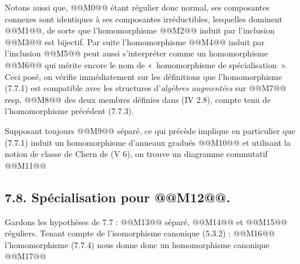 
Notons aussi que, @@M0@@ étant régulier donc normal, ses composantes connexes sont identiques à ses composantes irréductibles, lesquelles dominent @@M1@@, de sorte que l'homomorphisme @@M2@@ induit par l'inclusion @@M3@@ est bijectif. Par suite l'homomorphisme @@M4@@ induit par l'inclusion @@M5@@ peut aussi s'interpréter comme un homomorphisme
@@M6@@
qui mérite encore le nom de «~homomorphisme de spécialisation~». Ceci posé, on vérifie immédiatement sur les définitions que l'homomorphisme (7.7.1) est compatible avec les structures d'\emph{algèbres augmentées} sur @@M7@@ resp. @@M8@@ des deux membres définies dans (IV 2.8), compte tenu de l'homomorphisme précédent (7.7.3).

Supposant toujours @@M9@@ séparé, ce qui précède implique en particulier que (7.7.1) induit un homomorphisme d'anneaux gradués
@@M10@@
et utilisant la notion de classe de Chern de (V 6), on trouve un diagramme commutatif
@@M11@@

\subsection*{7.8. Spécialisation pour @@M12@@.}
Gardons les hypothèses de 7.7 : @@M13@@ séparé, @@M14@@ et @@M15@@ réguliers. Tenant compte de l'isomorphisme canonique (5.3.2) :
@@M16@@
l'homomorphisme (7.7.4) nous donne donc un homomorphisme canonique
@@M17@@
